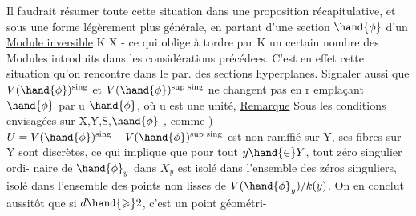 \margin{$\|$} Il faudrait résumer  toute cette situation dans une proposition
récapitulative, et sous une forme légèrement plus générale, en partant
d'une section $\hand{\phi}$ d'un \uline{Module inversible}  K  X - ce qui oblige
à tordre par K un certain nombre des Modules introduits dans les
considérations précédees. C'est en effet  cette situation qu'on
rencontre  dans le par. des sections hyperplanes. Signaler aussi que
\margin{|} $V(\hand{\phi})^{\text{sing}}$  et $V(\hand{\phi})^{\text{sup sing}}$ ne changent pas en r emplaçant $\hand{\phi}$ par u $\hand{\phi}$,
où u est une unité, 
\uline{Remarque} Sous les conditions envisagées sur X,Y,S,$\hand{\phi}$ , comme )
$U = V(\hand{\phi})^{\text{sing}}- V(\hand{\phi})^{\text{sup sing}}$ est non ramffié sur Y, ses fibres sur Y sont
discrètes, ce qui implique que pour tout $y\hand{\in} Y$, tout zéro singulier ordi-%
naire de $\hand{\phi}_y$ dans $X_y$ est isolé dans l'ensemble des zéros singuliers, 
 isolé dans l'ensemble des points non lisses de $V(\hand{\phi}_y)/k(y)$.
 On en conclut  aussitôt que si $d\hand{\geqslant} 2$, c'est un point géométri-%


